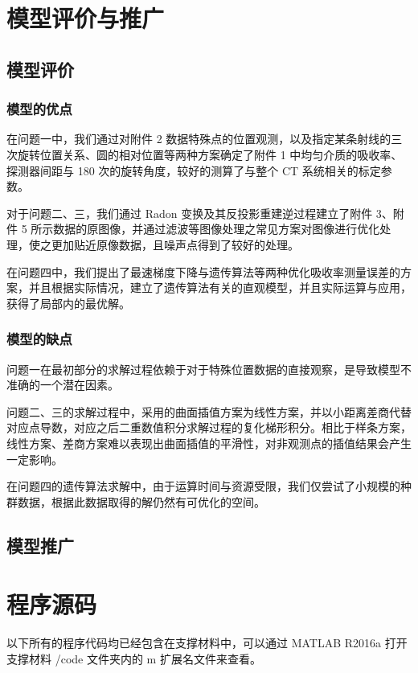 \documentclass[UTF8]{ctexart}
\begin{document}
\section{模型评价与推广}
\subsection{模型评价}
\subsubsection{模型的优点}
在问题一中，我们通过对附件 2 数据特殊点的位置观测，以及指定某条射线的三次旋转位置关系、圆的相对位置等两种方案确定了附件 1 中均匀介质的吸收率、探测器间距与 180 次的旋转角度，较好的测算了与整个 CT 系统相关的标定参数。

对于问题二、三，我们通过 Radon 变换及其反投影重建逆过程建立了附件 3、附件 5 所示数据的原图像，并通过滤波等图像处理之常见方案对图像进行优化处理，使之更加贴近原像数据，且噪声点得到了较好的处理。

在问题四中，我们提出了最速梯度下降与遗传算法等两种优化吸收率测量误差的方案，并且根据实际情况，建立了遗传算法有关的直观模型，并且实际运算与应用，获得了局部内的最优解。

\subsubsection{模型的缺点}
问题一在最初部分的求解过程依赖于对于特殊位置数据的直接观察，是导致模型不准确的一个潜在因素。

问题二、三的求解过程中，采用的曲面插值方案为线性方案，并以小距离差商代替对应点导数，对应之后二重数值积分求解过程的复化梯形积分。相比于样条方案，线性方案、差商方案难以表现出曲面插值的平滑性，对非观测点的插值结果会产生一定影响。

在问题四的遗传算法求解中，由于运算时间与资源受限，我们仅尝试了小规模的种群数据，根据此数据取得的解仍然有可优化的空间。

\subsection{模型推广}



\clearpage
\appendix
\appendixname
\section{程序源码}
以下所有的程序代码均已经包含在支撑材料中，可以通过 MATLAB R2016a 打开支撑材料 /code 文件夹内的 m 扩展名文件来查看。
\end{document}
